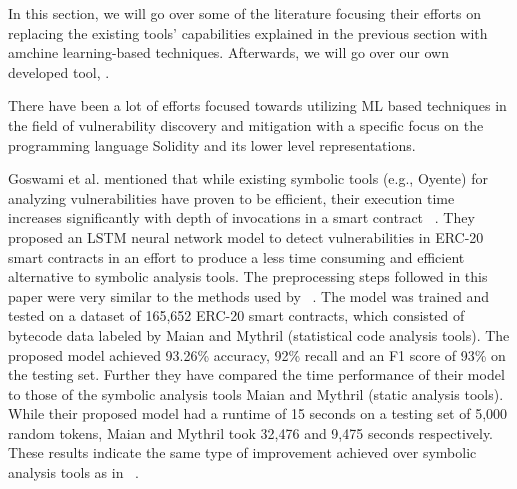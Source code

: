 In this section, we will go over some of the literature focusing their efforts on replacing the existing tools' capabilities explained in the previous section with amchine learning-based techniques.
Afterwards, we will go over our own developed tool, \slithersimil.

There have been a lot of efforts focused towards utilizing ML based techniques in the field of vulnerability discovery and mitigation with a specific focus on the programming language Solidity and
its lower level representations.

Goswami et al. mentioned that while existing symbolic tools (e.g., Oyente) for analyzing vulnerabilities have proven to be efficient, their execution time increases significantly with depth of invocations in a smart contract ~\cite{grech2019gigahorse}.
They proposed an LSTM neural network model to detect vulnerabilities in ERC-20 smart contracts in an effort to produce a less time consuming and efficient alternative to symbolic analysis tools.
The preprocessing steps followed in this paper were very similar to the methods used by ~\cite{madmax}.
The model was trained and tested on a dataset of 165,652 ERC-20 smart contracts, which consisted of bytecode data labeled by Maian and Mythril (statistical code analysis tools).
The proposed model achieved 93.26\% accuracy, 92\% recall and an F1 score of 93\% on the testing set.
Further they have compared the time performance of their model to those of the symbolic analysis tools Maian and Mythril (static analysis tools).
While their proposed model had a runtime of 15 seconds on a testing set of 5,000 random tokens, Maian and Mythril took 32,476 and 9,475 seconds respectively.
These results indicate the same type of improvement achieved over symbolic analysis tools as in ~\cite{grech2019gigahorse}.


